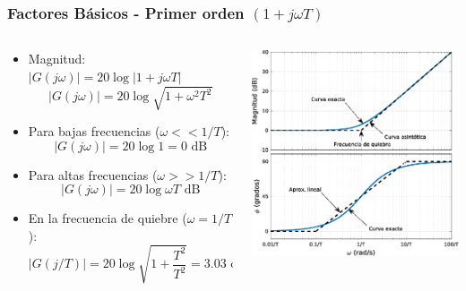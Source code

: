 \documentclass[aspectratio=169, handout]{beamer}
\theoremstyle{definition}
\theoremstyle{plain}
\theoremstyle{remark}
\begin{document}
\begin{frame}[<+->]\frametitle{Factores Básicos - Primer orden $(1+j \omega T)$}
\begin{columns}
	\begin{column}{0.5\textwidth}
	\small
	\begin{itemize}
		\item Magnitud: $\left| G(j\omega) \right| = 20 \log \left| 1+j\omega T \right|$
		\begin{equation*}
			\left| G(j\omega) \right| = 20 \log \sqrt{1+\omega^2 T^2}
		\end{equation*}
		\item Para bajas frecuencias ($\omega << 1/T$):
		\begin{equation*}
			\left| G(j\omega) \right| = 20 \log 1 = 0 \text{ dB}
		\end{equation*}
		\item Para altas frecuencias ($\omega >> 1/T$):
		\begin{equation*}
			\left| G(j\omega) \right| = 20 \log \omega T \text{ dB}
		\end{equation*}
		\item En la frecuencia de quiebre ($\omega = 1/T$):
		\begin{equation*}
			\left| G(j/T) \right| = 20\log \sqrt{1 + \frac{T^2}{T^2}} = 3.03 \text{ dB}
		\end{equation*}
	\end{itemize}
	\end{column}
	\begin{column}{0.5\textwidth}
	\centering
	\includegraphics[width=6.5cm]{images/bodeFirstOrderDerivative.eps}
	\end{column}
\end{columns}
\end{frame}
\end{document}
